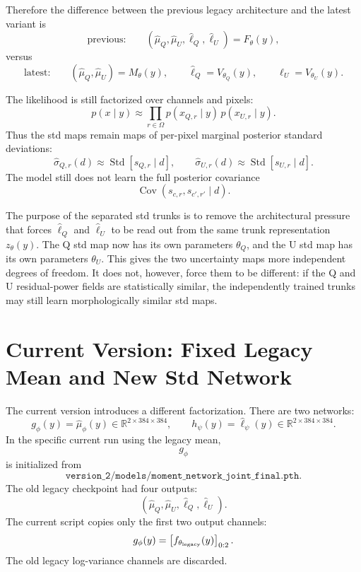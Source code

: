 \documentclass[11pt]{article}
\newcommand{\mean}{\mu}
\newcommand{\logvar}{\ell}
\newcommand{\std}{\sigma}
\newcommand{\pix}{r}
\newcommand{\chan}{c}
\newcommand{\grid}{\Omega}
\newcommand{\R}{\mathbb{R}}
\begin{document}
Therefore the difference between the previous legacy architecture and the
latest variant is
\[
  \text{previous:}\qquad
  (\widehat{\mean}_Q,\widehat{\mean}_U,
   \widehat{\logvar}_Q,\widehat{\logvar}_U)
  =
  F_\theta(y),
\]
versus
\[
  \text{latest:}\qquad
  (\widehat{\mean}_Q,\widehat{\mean}_U)=M_\theta(y),
  \qquad
  \widehat{\logvar}_Q=V_{\theta_Q}(y),
  \qquad
  \widehat{\logvar}_U=V_{\theta_U}(y).
\]

The likelihood is still factorized over channels and pixels:
\[
  p(x\mid y)
  \approx
  \prod_{\pix\in\grid}
  p(x_{Q,\pix}\mid y)\,
  p(x_{U,\pix}\mid y).
\]
Thus the std maps remain maps of per-pixel marginal posterior standard
deviations:
\[
  \widehat{\std}_{Q,\pix}(d)
  \approx
  \operatorname{Std}[s_{Q,\pix}\mid d],
  \qquad
  \widehat{\std}_{U,\pix}(d)
  \approx
  \operatorname{Std}[s_{U,\pix}\mid d].
\]
The model still does not learn the full posterior covariance
\[
  \operatorname{Cov}(s_{\chan,\pix},s_{\chan',\pix'}\mid d).
\]

The purpose of the separated std trunks is to remove the architectural pressure
that forces \(\widehat{\logvar}_Q\) and \(\widehat{\logvar}_U\) to be read out
from the same trunk representation \(z_\theta(y)\).  The Q std map now has its
own parameters \(\theta_Q\), and the U std map has its own parameters
\(\theta_U\).  This gives the two uncertainty maps more independent degrees of
freedom.  It does not, however, force them to be different: if the Q and U
residual-power fields are statistically similar, the independently trained
trunks may still learn morphologically similar std maps.

\section{Current Version: Fixed Legacy Mean and New Std Network}

The current version introduces a different factorization.  There are two
networks:
\[
  g_\phi(y)
  =
  \widehat{\mean}_{\phi}(y)
  \in \R^{2\times384\times384},
  \qquad
  h_\psi(y)
  =
  \widehat{\logvar}_{\psi}(y)
  \in \R^{2\times384\times384}.
\]
In the specific current run using the legacy mean,
\[
  g_\phi
\]
is initialized from
\[
  \texttt{version\_2/models/moment\_network\_joint\_final.pth}.
\]
The old legacy checkpoint had four outputs:
\[
  (\widehat{\mean}_Q,\widehat{\mean}_U,
    \widehat{\logvar}_Q,\widehat{\logvar}_U).
\]
The current script copies only the first two output channels:
\[
  g_\phi(y)
  =
  \left[
    f_{\theta_{\rm legacy}}(y)
  \right]_{0:2}.
\]
The old legacy log-variance channels are discarded.
\end{document}
